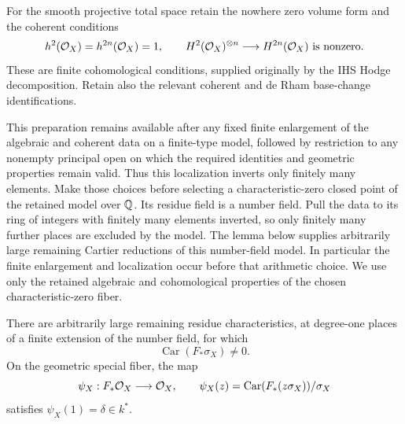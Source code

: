 For the smooth projective total space retain the nowhere zero volume
form and the coherent conditions
\begin{equation}\label{bc:coherent-cup}
 h^2(\mathcal O_X)=h^{2n}(\mathcal O_X)=1,\qquad
 H^2(\mathcal O_X)^{\otimes n}\longrightarrow H^{2n}(\mathcal O_X)
                   \text{ is nonzero}.
\end{equation}
These are finite cohomological conditions, supplied originally by the
IHS Hodge decomposition.  Retain also the relevant coherent and de Rham
base-change identifications.

This preparation remains available after any fixed finite enlargement
of the algebraic and coherent data on a finite-type model, followed by
restriction to any nonempty principal open on which the required
identities and geometric properties remain valid.  Thus this localization
inverts only finitely many elements.  Make those choices before selecting a
characteristic-zero
closed point of the retained model over $\mathbb Q$.  Its residue field is a
number field.  Pull the data to its ring of integers with finitely many
elements inverted, so only finitely many further places are excluded by
the model.
The lemma below supplies arbitrarily large remaining Cartier reductions
of this number-field model.  In particular the finite enlargement and
localization occur before that arithmetic choice.  We use only the
retained algebraic and cohomological properties of the chosen
characteristic-zero fiber.

\begin{lemma}\label{bc:cartier-primes}
There are arbitrarily large remaining residue characteristics, at
degree-one places of a finite extension of the number field, for which
\[
                   \operatorname{Car}(F_*\sigma_X)\ne0.
\]
On the geometric special fiber, the map
\begin{equation}\label{bc:cartier-splitting}
 \psi_X:F_*\mathcal O_X\longrightarrow\mathcal O_X,
 \qquad \psi_X(z)=\operatorname{Car}(F_*(z\sigma_X))/\sigma_X
\end{equation}
satisfies $\psi_X(1)=\delta\in k^*$.
\end{lemma}

